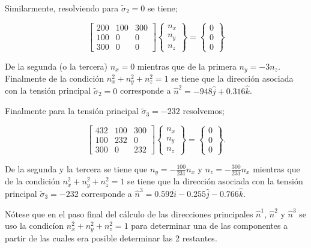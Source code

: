\documentclass[../notas medios.tex]{subfiles}
\begin{document}
Similarmente, resolviendo para ${{\tilde \sigma }_2} = 0$ se tiene;


\[\left[ {\begin{array}{*{20}{c}}
{ 200}&{100}&{300}\\
{100}&{ 0}&0\\
{300}&0&{0}
\end{array}} \right]\left\{ {\begin{array}{*{20}{c}}
{{n_x}}\\
{{n_y}}\\
{{n_z}}
\end{array}} \right\} = \left\{ {\begin{array}{*{20}{c}}
0\\
0\\
0
\end{array}} \right\}\]

De la segunda (o la tercera) ${n_x} = 0$ mientras que de la primera ${n_y} =  - 3{n_z}$. Finalmente de la condición $n_x^2 + n_y^2 + n_z^2 = 1$ se tiene que la dirección asociada con la tensión principal ${{\tilde \sigma }_2} = 0$ corresponde a ${{\hat n}^2} =-948\hat j + 0.316\hat k$.

Finalmente para la tensión principal ${{\tilde \sigma }_3} =  - 232$ resolvemos;

\[\left[ {\begin{array}{*{20}{c}}
{ 432}&{100}&{300}\\
{100}&{ 232}&0\\
{300}&0&{232}
\end{array}} \right]\left\{ {\begin{array}{*{20}{c}}
{{n_x}}\\
{{n_y}}\\
{{n_z}}
\end{array}} \right\} = \left\{ {\begin{array}{*{20}{c}}
0\\
0\\
0
\end{array}} \right\}.\]

De la segunda y la tercera se tiene que ${n_y} =  - \frac{{100}}{{231}}{n_x}$ y ${n_z} =  - \frac{{300}}{{231}}{n_x}$  mientras que de la condición $n_x^2 + n_y^2 + n_z^2 = 1$ se tiene que la dirección asociada con la tensión principal ${{\tilde \sigma }_3} = -232$ corresponde a ${{\hat n}^3} = 0.592\hat i - 0.255\hat j - 0.766\hat k$.

Nótese que en el paso final del cálculo de las direcciones principales ${{\hat n}^1}$, ${{\hat n}^2}$ y ${{\hat n}^3}$ se uso la condicíon $n_x^2 + n_y^2 + n_z^2 = 1$ para determinar una de las componentes a partir de las cuales era posible determinar las 2 restantes.
\end{document}
